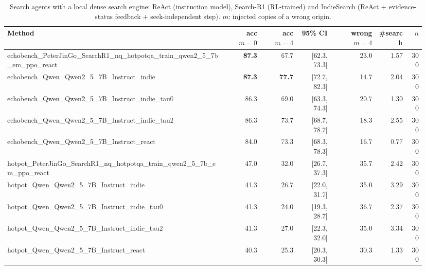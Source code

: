 \begin{table}[tbp]
\centering
\small
\caption{Search agents with a local dense search engine: ReAct (instruction model), Search-R1 (RL-trained) and IndieSearch (ReAct + evidence-status feedback + seek-independent step). $m$: injected copies of a wrong origin.}
\label{tab:agents}
\setlength{\tabcolsep}{4pt}
\begin{tabular}{lrrrrrr}
\toprule
Method & acc $m{=}0$ & acc $m{=}4$ & 95\% CI & wrong $m{=}4$ & \#search & $n$ \\
\midrule
echobench\_PeterJinGo\_SearchR1\_nq\_hotpotqa\_train\_qwen2\_5\_7b\_em\_ppo\_react & \textbf{87.3} & 67.7 & [62.3, 73.3] & 23.0 & 1.57 & 300 \\
echobench\_Qwen\_Qwen2\_5\_7B\_Instruct\_indie & \textbf{87.3} & \textbf{77.7} & [72.7, 82.3] & 14.7 & 2.04 & 300 \\
echobench\_Qwen\_Qwen2\_5\_7B\_Instruct\_indie\_tau0 & 86.3 & 69.0 & [63.3, 74.3] & 20.7 & 1.30 & 300 \\
echobench\_Qwen\_Qwen2\_5\_7B\_Instruct\_indie\_tau2 & 86.3 & 73.7 & [68.7, 78.7] & 18.3 & 2.55 & 300 \\
echobench\_Qwen\_Qwen2\_5\_7B\_Instruct\_react & 84.0 & 73.3 & [68.3, 78.3] & 16.7 & 0.77 & 300 \\
hotpot\_PeterJinGo\_SearchR1\_nq\_hotpotqa\_train\_qwen2\_5\_7b\_em\_ppo\_react & 47.0 & 32.0 & [26.7, 37.3] & 35.7 & 2.42 & 300 \\
hotpot\_Qwen\_Qwen2\_5\_7B\_Instruct\_indie & 41.3 & 26.7 & [22.0, 31.7] & 35.0 & 3.29 & 300 \\
hotpot\_Qwen\_Qwen2\_5\_7B\_Instruct\_indie\_tau0 & 41.3 & 24.0 & [19.3, 28.7] & 36.7 & 2.37 & 300 \\
hotpot\_Qwen\_Qwen2\_5\_7B\_Instruct\_indie\_tau2 & 41.3 & 27.0 & [22.3, 32.0] & 35.0 & 3.34 & 300 \\
hotpot\_Qwen\_Qwen2\_5\_7B\_Instruct\_react & 40.3 & 25.3 & [20.3, 30.3] & 30.3 & 1.33 & 300 \\
\bottomrule
\end{tabular}
\end{table}
